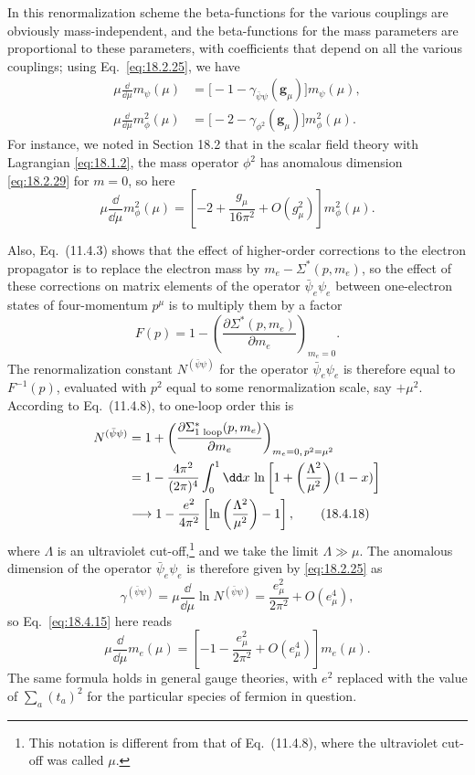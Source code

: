 In this renormalization scheme the beta-functions for the various couplings are obviously mass-independent, and the beta-functions for the mass parameters are proportional to these parameters, with coefficients that depend on all the various couplings; using Eq.~\eqref{eq:18.2.25}, we have
\begin{align}
\mu\frac{\dd}{\dd\mu}m_\psi(\mu)
&=\bigl[-1-\gamma_{\bar\psi\psi}(\mathbf{g}_\mu)\bigr]m_\psi(\mu),
\tag{18.4.15}\label{eq:18.4.15}\\
\mu\frac{\dd}{\dd\mu}m_\phi^2(\mu)
&=\bigl[-2-\gamma_{\phi^2}(\mathbf{g}_\mu)\bigr]m_\phi^2(\mu).
\tag{18.4.16}\label{eq:18.4.16}
\end{align}
For instance, we noted in Section 18.2 that in the scalar field theory with Lagrangian \eqref{eq:18.1.2}, the mass operator $\phi^2$ has anomalous dimension \eqref{eq:18.2.29} for $m=0$, so here
\begin{equation}
\mu\frac{\dd}{\dd\mu}m_\phi^2(\mu)
=\left[-2+\frac{g_\mu}{16\pi^2}+O(g_\mu^2)\right]m_\phi^2(\mu).
\tag{18.4.17}\label{eq:18.4.17}
\end{equation}

Also, Eq.~(11.4.3) shows that the effect of higher-order corrections to the electron propagator is to replace the electron mass by $m_e-\Sigma^*(p,m_e)$, so the effect of these corrections on matrix elements of the operator $\bar\psi_e\psi_e$ between one-electron states of four-momentum $p^\mu$ is to multiply them by a factor
\[
F(p)=1-\left(\frac{\partial\Sigma^*(p,m_e)}{\partial m_e}\right)_{m_e=0}.
\]
The renormalization constant $N^{(\bar\psi\psi)}$ for the operator $\bar\psi_e\psi_e$ is therefore equal to $F^{-1}(p)$, evaluated with $p^2$ equal to some renormalization scale, say $+\mu^2$. According to Eq.~(11.4.8), to one-loop order this is
\begin{align}
N^{(\bar\psi\psi)}
&=1+\left(\frac{\partial\Sigma^*_{\text{1 loop}}(p,m_e)}{\partial m_e}\right)_{m_e=0,\,p^2=\mu^2}
\notag\\
&=1-\frac{4\pi^2}{(2\pi)^4}\int_0^1 \dd x\,
\ln\left[1+\left(\frac{\Lambda^2}{\mu^2}\right)(1-x)\right]
\notag\\
&\longrightarrow 1-\frac{e^2}{4\pi^2}
\left[\ln\left(\frac{\Lambda^2}{\mu^2}\right)-1\right],
\tag{18.4.18}\label{eq:18.4.18}
\end{align}
where $\Lambda$ is an ultraviolet cut-off,\footnote{This notation is different from that of Eq.~(11.4.8), where the ultraviolet cut-off was called $\mu$.} and we take the limit $\Lambda\gg\mu$. The anomalous dimension of the operator $\bar\psi_e\psi_e$ is therefore given by \eqref{eq:18.2.25} as
\begin{equation}
\gamma^{(\bar\psi\psi)}=\mu\frac{\dd}{\dd\mu}\ln N^{(\bar\psi\psi)}
=\frac{e_\mu^2}{2\pi^2}+O(e_\mu^4),
\tag{18.4.19}\label{eq:18.4.19}
\end{equation}
so Eq.~\eqref{eq:18.4.15} here reads
\begin{equation}
\mu\frac{\dd}{\dd\mu}m_e(\mu)
=\left[-1-\frac{e_\mu^2}{2\pi^2}+O(e_\mu^4)\right]m_e(\mu).
\tag{18.4.20}\label{eq:18.4.20}
\end{equation}
The same formula holds in general gauge theories, with $e^2$ replaced with the value of $\sum_a(t_a)^2$ for the particular species of fermion in question.

